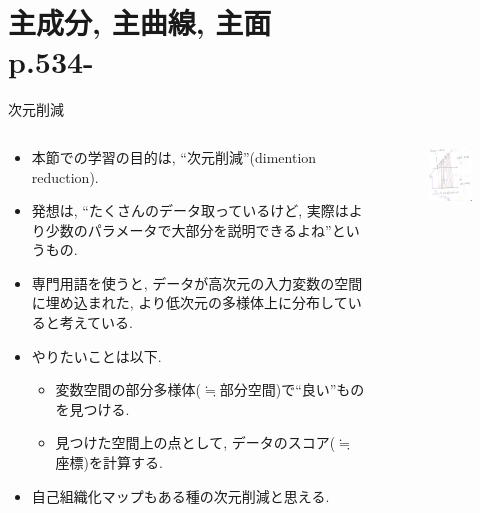 \documentclass[dvipdfmx,8pt]{beamer}
\begin{document}
  \section{主成分, 主曲線, 主面\\p.534-}
  \begin{frame}{次元削減}
    \begin{columns}[t]
      \begin{column}{0.5\textwidth}
        \begin{itemize}
          \item 本節での学習の目的は, ``次元削減''(dimention reduction).
          \item 発想は, ``たくさんのデータ取っているけど, 実際はより少数のパラメータで大部分を説明できるよね''というもの.
          \item 専門用語を使うと, データが高次元の入力変数の空間に埋め込まれた, より低次元の多様体上に分布していると考えている.
          \item やりたいことは以下.
            \begin{itemize}
              \item 変数空間の部分多様体($\fallingdotseq$部分空間)で``良い''ものを見つける.
              \item 見つけた空間上の点として, データのスコア($\fallingdotseq$座標)を計算する.
            \end{itemize}
          \item 自己組織化マップもある種の次元削減と思える.
        \end{itemize}
      \end{column}
      \begin{column}{0.5\textwidth}
        \begin{figure}[htb]
          \centering
          \includegraphics[width=5cm,clip]{images/dimention-reduction.jpg}
        \end{figure}
      \end{column}
    \end{columns}
  \end{frame}
\end{document}
